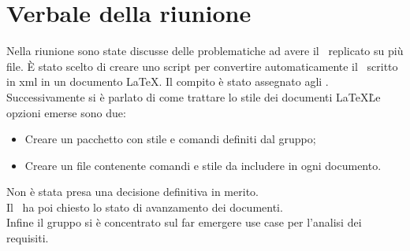 \documentclass[../Riunione16-01-12.tex]{subfiles}
\begin{document}
\section{Verbale della riunione}
Nella riunione sono state discusse delle problematiche ad avere il \glossario\ replicato su più file. È stato scelto di creare uno script per convertire automaticamente il \glossario\ scritto in xml in un documento \LaTeX. Il compito è stato assegnato agli \amministratori. \\
Successivamente si è parlato di come trattare lo stile dei documenti \LaTeX\. Le opzioni emerse sono due:
	\begin{itemize}
		\item Creare un pacchetto con stile e comandi definiti dal gruppo;
		\item Creare un file contenente comandi e stile da includere in ogni documento.
	\end{itemize}
Non è stata presa una decisione definitiva in merito.\\
Il \responsabilediprogetto\ ha poi chiesto lo stato di avanzamento dei documenti.\\
Infine il gruppo si è concentrato sul far emergere use case per l'analisi dei requisiti.
\end{document}
